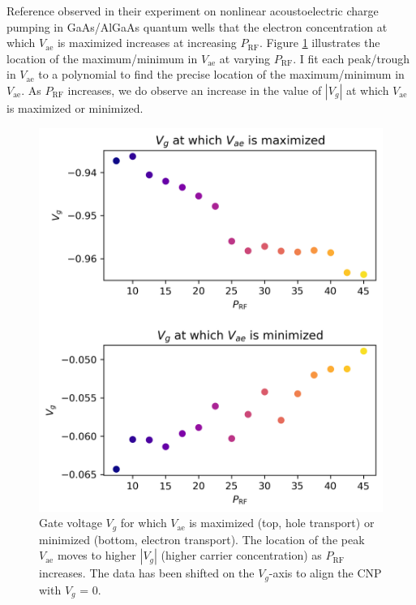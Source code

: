 \documentclass[double,12pt,1in,seploa]{beavtex}
\begin{document}
Reference \cite{rotter_nonlinear_1999} observed in their experiment on nonlinear acoustoelectric charge pumping in GaAs/AlGaAs quantum wells that the electron concentration at which $V_{\mathrm{ae}}$ is maximized increases at increasing $P_{\mathrm{RF}}$. Figure \ref{Vg at which vae is max or min} illustrates the location of the maximum/minimum in $V_{\mathrm{ae}}$ at varying $P_{\mathrm{RF}}$. I fit each peak/trough in $V_{\mathrm{ae}}$ to a polynomial to find the precise location of the maximum/minimum in $V_{\mathrm{ae}}$. As $P_{\mathrm{RF}}$ increases, we do observe an increase in the value of $|V_g|$ at which $V_{\mathrm{ae}}$ is maximized or minimized.

\begin{figure}
    \includegraphics{Vg at which vae is max or min.png}
    \caption{Gate voltage $V_g$ for which $V_{\mathrm{ae}}$ is maximized (top, hole transport) or minimized (bottom, electron transport). The location of the peak $V_{\mathrm{ae}}$ moves to higher $|V_g|$ (higher carrier concentration) as $P_{\mathrm{RF}}$ increases. The data has been shifted on the $V_g$-axis to align the CNP with $V_g$ = 0.}
    \label{Vg at which vae is max or min}
\end{figure}
\end{document}
